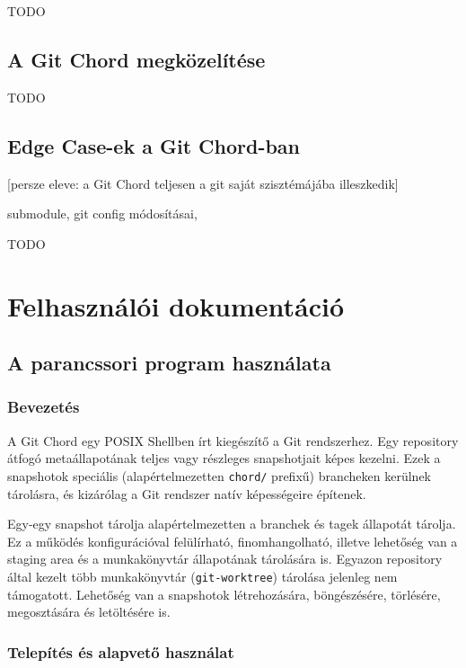 \documentclass[final]{elteikthesis}[2025/03/25]
\begin{document}
TODO

\section{A Git Chord megközelítése}

TODO

\section{Edge Case-ek a Git Chord-ban}

[persze eleve: a Git Chord teljesen a git saját szisztémájába illeszkedik]

submodule, git config módosításai, 

TODO

\cleardoublepage

\chapter{Felhasználói dokumentáció}

\section{A parancssori program használata}

\subsection{Bevezetés}

A Git Chord egy POSIX Shellben írt kiegészítő a Git rendszerhez.
Egy repository átfogó metaállapotának teljes vagy részleges snapshotjait képes kezelni.
Ezek a snapshotok speciális (alapértelmezetten \texttt{chord/} prefixű) brancheken kerülnek tárolásra,
és kizárólag a Git rendszer natív képességeire építenek.

Egy-egy snapshot tárolja alapértelmezetten a branchek és tagek állapotát tárolja.
Ez a működés konfigurációval felülírható, finomhangolható,
illetve lehetőség van a staging area és a munkakönyvtár állapotának tárolására is.
Egyazon repository által kezelt több munkakönyvtár (\texttt{git-worktree}) tárolása jelenleg nem támogatott.
Lehetőség van a snapshotok létrehozására, böngészésére, törlésére, megosztására és letöltésére is.

\subsection{Telepítés és alapvető használat}
\end{document}
